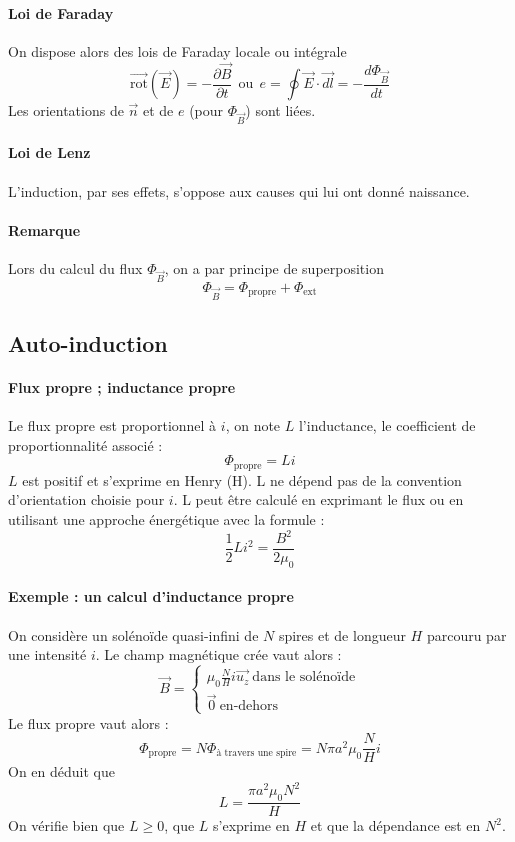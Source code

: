 \documentclass[french]{book}
\theoremstyle{plain}
\theoremstyle{definition}
\theoremstyle{remark}
\newcommand{\rot}{\overrightarrow{\text{rot}}}
\begin{document}
\paragraph{Loi de Faraday} On dispose alors des lois de Faraday locale ou intégrale $$\rot\left(\overrightarrow{E}\right)=-\frac{\partial \overrightarrow{B}}{\partial t} \ \ \text{ou} \ \ e=\oint\overrightarrow{E}\cdot\overrightarrow{dl}=-\frac{d\Phi_{\overrightarrow{B}}}{dt}$$
Les orientations de $\overrightarrow{n}$ et de $e$ (pour $\Phi_{\overrightarrow{B}}$) sont liées.
\paragraph{Loi de Lenz} L'induction, par ses effets, s'oppose aux causes qui lui ont donné naissance.
\paragraph{Remarque} Lors du calcul du flux $\Phi_{\overrightarrow{B}}$, on a par principe de superposition $$\Phi_{\overrightarrow{B}}=\Phi_\text{propre}+\Phi_\text{ext}$$
\subsection{Auto-induction}
\paragraph{Flux propre ; inductance propre} Le flux propre est proportionnel à $i$, on note $L$ l'inductance, le coefficient de proportionnalité associé : $$\Phi_\text{propre}=Li$$ $L$ est positif et s'exprime en Henry (H). L ne dépend pas de la convention d'orientation choisie pour $i$. L peut être calculé en exprimant le flux ou en utilisant une approche énergétique avec la formule : $$\frac{1}{2}Li^2=\frac{B^2}{2\mu_0}$$
\paragraph{Exemple : un calcul d'inductance propre} On considère un solénoïde quasi-infini de $N$ spires et de longueur $H$ parcouru par une intensité $i$. Le champ magnétique crée vaut alors : $$\overrightarrow{B}=\begin{cases}
	\displaystyle\mu_0 \frac{N}{H} i \overrightarrow{u_z} \ \text{dans le solénoïde} \\[2mm]
	\overrightarrow{0} \ \text{en-dehors}
\end{cases}$$ Le flux propre vaut alors : $$\Phi_\text{propre}=N\Phi_\text{à travers une spire}=N\pi a^2\mu_0\frac{N}{H}i$$ On en déduit que $$L=\frac{\pi a^2\mu_0 N^2}{H}$$
On vérifie bien que $L\geqslant0$, que $L$ s'exprime en $H$ et que la dépendance est en $N^2$.
\end{document}
